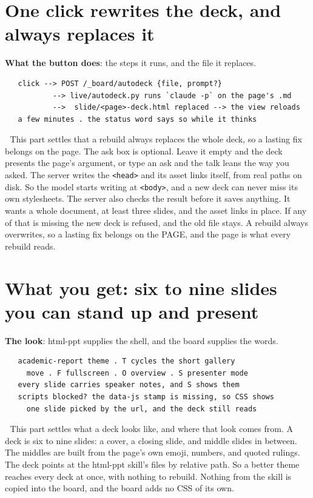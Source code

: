 \section{One click rewrites the deck, and always replaces it}
\textbf{What the button does}: the steps it runs, and the file it replaces.

\begin{verbatim}
   click --> POST /_board/autodeck {file, prompt?}
           --> live/autodeck.py runs `claude -p` on the page's .md
           -->  slide/<page>-deck.html replaced --> the view reloads
   a few minutes . the status word says so while it thinks
\end{verbatim}
📌 This part settles that a rebuild always replaces the whole deck, so a lasting fix belongs on the page. The ask box is optional. Leave it empty and the deck presents the page's argument, or type an ask and the talk leans the way you asked. The server writes the \texttt{<head>} and its asset links itself, from real paths on disk. So the model starts writing at \texttt{<body>}, and a new deck can never miss its own stylesheets. The server also checks the result before it saves anything. It wants a whole document, at least three slides, and the asset links in place. If any of that is missing the new deck is refused, and the old file stays. A rebuild always overwrites, so a lasting fix belongs on the PAGE, and the page is what every rebuild reads.


\section{What you get: six to nine slides you can stand up and present}
\textbf{The look}: html-ppt supplies the shell, and the board supplies the words.

\begin{verbatim}
   academic-report theme . T cycles the short gallery
     move . F fullscreen . O overview . S presenter mode
   every slide carries speaker notes, and S shows them
   scripts blocked? the data-js stamp is missing, so CSS shows
     one slide picked by the url, and the deck still reads
\end{verbatim}
📌 This part settles what a deck looks like, and where that look comes from. A deck is six to nine slides: a cover, a closing slide, and middle slides in between. The middles are built from the page's own emoji, numbers, and quoted rulings. The deck points at the html-ppt skill's files by relative path. So a better theme reaches every deck at once, with nothing to rebuild. Nothing from the skill is copied into the board, and the board adds no CSS of its own.


